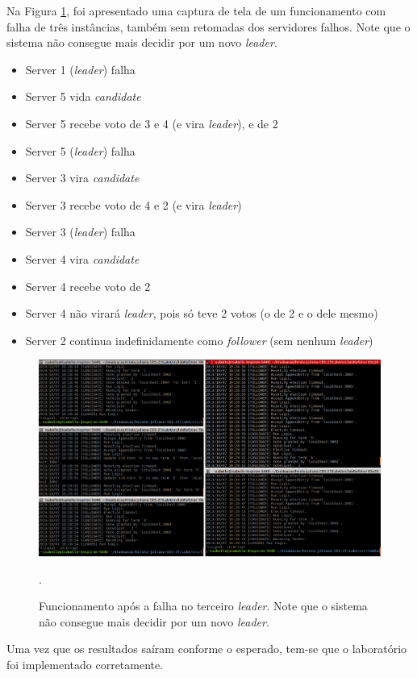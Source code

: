 \documentclass[journal,onecolumn]{IEEEtran}
\begin{document}
Na Figura \ref{3_falhas}, foi apresentado uma captura de tela de um funcionamento com falha de três instâncias, também sem retomadas dos servidores falhos. Note que o sistema não consegue mais decidir por um novo \textit{leader}.

\begin{itemize}
\item Server 1 (\textit{leader}) falha
\item Server 5 vida \textit{candidate}
\item Server 5 recebe voto de 3 e 4 (e vira \textit{leader}), e de 2
\item Server 5 (\textit{leader}) falha
\item Server 3 vira \textit{candidate}
\item Server 3 recebe voto de 4 e 2 (e vira \textit{leader})
\item Server 3 (\textit{leader}) falha
\item Server 4 vira \textit{candidate}
\item Server 4 recebe voto de 2
\item Server 4 não virará \textit{leader}, pois só teve 2 votos (o de 2 e o dele mesmo)
\item Server 2 continua indefinidamente como \textit{follower} (sem nenhum \textit{leader})
\end{itemize}

\begin{figure}[H]
\centering
\centerline{\includegraphics[scale=0.4]{imagens/3_falhas.png}}
\caption{Funcionamento após a falha no terceiro \textit{leader}. Note que o sistema não consegue mais decidir por um novo \textit{leader}.}.
\label{3_falhas}
\end{figure}

Uma vez que os resultados saíram conforme o esperado, tem-se que o laboratório foi implementado corretamente.
\end{document}

